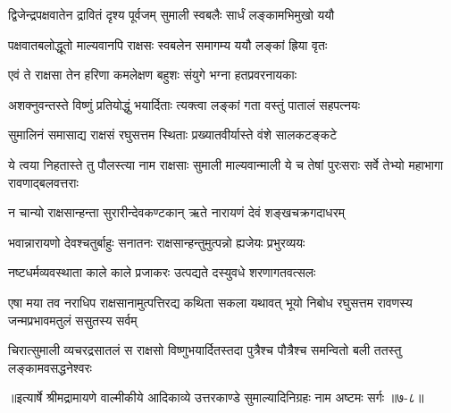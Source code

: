 \twolineshloka
{द्विजेन्द्रपक्षवातेन द्रावितं दृश्य पूर्वजम्}
{सुमाली स्वबलैः सार्धं लङ्कामभिमुखो ययौ} %

\twolineshloka
{पक्षवातबलोद्धूतो माल्यवानपि राक्षसः}
{स्वबलेन समागम्य ययौ लङ्कां ह्रिया वृतः} %

\twolineshloka
{एवं ते राक्षसा तेन हरिणा कमलेक्षण}
{बहुशः संयुगे भग्ना हतप्रवरनायकाः} %

\twolineshloka
{अशक्नुवन्तस्ते विष्णुं प्रतियोद्धुं भयार्दिताः}
{त्यक्त्वा लङ्कां गता वस्तुं पातालं सहपत्नयः} %

\twolineshloka
{सुमालिनं समासाद्य राक्षसं रघुसत्तम}
{स्थिताः प्रख्यातवीर्यास्ते वंशे सालकटङ्कटे} %

\twolineshloka
{ये त्वया निहतास्ते तु पौलस्त्या नाम राक्षसाः}
{सुमाली माल्यवान्माली ये च तेषां पुरःसराः सर्वे तेभ्यो महाभागा रावणाद्बलवत्तराः} %

\twolineshloka
{न चान्यो राक्षसान्हन्ता सुरारीन्देवकण्टकान्}
{ऋते नारायणं देवं शङ्खचक्रगदाधरम्} %

\twolineshloka
{भवान्नारायणो देवश्चतुर्बाहुः सनातनः}
{राक्षसान्हन्तुमुत्पन्नो ह्यजेयः प्रभुरव्ययः} %

\twolineshloka
{नष्टधर्मव्यवस्थाता काले काले प्रजाकरः}
{उत्पद्यते दस्युवधे शरणागतवत्सलः} %

\twolineshloka
{एषा मया तव नराधिप राक्षसानामुत्पत्तिरद्य कथिता सकला यथावत्}
{भूयो निबोध रघुसत्तम रावणस्य जन्मप्रभावमतुलं ससुतस्य सर्वम्} %

\twolineshloka
{चिरात्सुमाली व्यचरद्रसातलं स राक्षसो विष्णुभयार्दितस्तदा}
{पुत्रैश्च पौत्रैश्च समन्वितो बली ततस्तु लङ्कामवसद्धनेश्वरः} %


॥इत्यार्षे श्रीमद्रामायणे वाल्मीकीये आदिकाव्ये उत्तरकाण्डे सुमाल्यादिनिग्रहः नाम अष्टमः सर्गः ॥७-८॥
